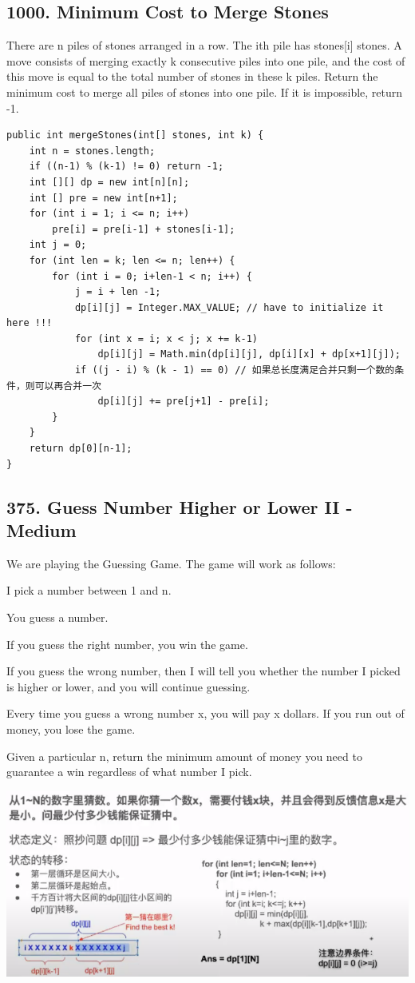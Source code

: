 \documentclass[9pt, b5paper]{article}
\begin{document}
\subsection{1000. Minimum Cost to Merge Stones}
\label{sec-4-19}
There are n piles of stones arranged in a row. The ith pile has stones[i] stones.
A move consists of merging exactly k consecutive piles into one pile, and the cost of this move is equal to the total number of stones in these k piles.
Return the minimum cost to merge all piles of stones into one pile. If it is impossible, return -1.
\begin{verbatim}
public int mergeStones(int[] stones, int k) {
    int n = stones.length;
    if ((n-1) % (k-1) != 0) return -1;
    int [][] dp = new int[n][n];
    int [] pre = new int[n+1];
    for (int i = 1; i <= n; i++) 
        pre[i] = pre[i-1] + stones[i-1];
    int j = 0;
    for (int len = k; len <= n; len++) {
        for (int i = 0; i+len-1 < n; i++) {
            j = i + len -1;
            dp[i][j] = Integer.MAX_VALUE; // have to initialize it here !!!
            for (int x = i; x < j; x += k-1) 
                dp[i][j] = Math.min(dp[i][j], dp[i][x] + dp[x+1][j]);
            if ((j - i) % (k - 1) == 0) // 如果总长度满足合并只剩一个数的条件，则可以再合并一次
                dp[i][j] += pre[j+1] - pre[i];
        }
    }
    return dp[0][n-1];
}
\end{verbatim}

\subsection{375. Guess Number Higher or Lower II - Medium}
\label{sec-4-20}
We are playing the Guessing Game. The game will work as follows:

I pick a number between 1 and n.

You guess a number.

If you guess the right number, you win the game.

If you guess the wrong number, then I will tell you whether the number I picked is higher or lower, and you will continue guessing.

Every time you guess a wrong number x, you will pay x dollars. If you run out of money, you lose the game.

Given a particular n, return the minimum amount of money you need to guarantee a win regardless of what number I pick.

\includegraphics[width=.9\linewidth]{./pic/guessNumber.png}
\end{document}
